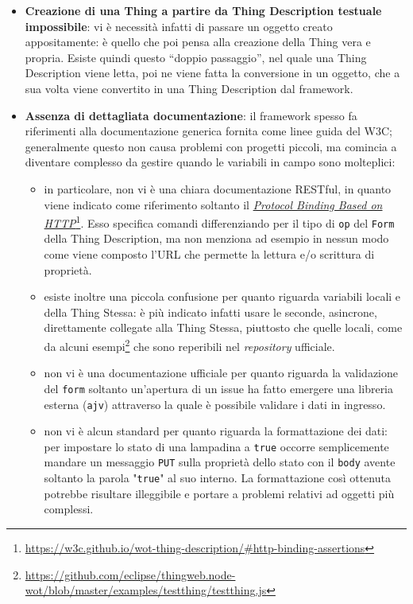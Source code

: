 \documentclass[12pt,a4paper,openright,oneside]{report}
\newcommand{\quotes}[1]{``#1''}
\begin{document}
\begin{itemize}
	\item \textbf{Creazione di una Thing a partire da Thing Description testuale impossibile}: vi è necessità infatti di passare un oggetto creato appositamente: è quello che poi pensa alla creazione della Thing vera e propria. Esiste quindi questo \quotes{doppio passaggio}, nel quale una Thing Description viene letta, poi ne viene fatta la conversione in un oggetto, che a sua volta viene convertito in una Thing Description dal framework.
	
	\item \textbf{Assenza di dettagliata documentazione}: il framework spesso fa riferimenti alla documentazione generica fornita come linee guida del W3C; generalmente questo non causa problemi con progetti piccoli, ma comincia a diventare complesso da gestire quando le variabili in campo sono molteplici:
		\begin{itemize}
			\item in particolare, non vi è una chiara documentazione RESTful, in quanto viene indicato come riferimento soltanto il \href{https://w3c.github.io/wot-thing-description/#http-binding-assertions}{\textit{Protocol Binding Based on HTTP}}\footnote{\url{https://w3c.github.io/wot-thing-description/\#http-binding-assertions}}. Esso specifica comandi differenziando per il tipo di \texttt{op} del \texttt{Form} della Thing Description, ma non menziona ad esempio in nessun modo come viene composto l'URL che permette la lettura e/o scrittura di proprietà.
			
			\item esiste inoltre una piccola confusione per quanto riguarda variabili locali e della Thing Stessa: è più indicato infatti usare le seconde, asincrone, direttamente collegate alla Thing Stessa, piuttosto che quelle locali, come da alcuni esempi\footnote{\url{https://github.com/eclipse/thingweb.node-wot/blob/master/examples/testthing/testthing.js}} che sono reperibili nel \textit{repository} ufficiale.
			
			\item non vi è una documentazione ufficiale per quanto riguarda la validazione del \texttt{form} soltanto un'apertura di un issue ha fatto emergere una libreria esterna (\texttt{ajv}) attraverso la quale è possibile validare i dati in ingresso.
			
			\item non vi è alcun standard per quanto riguarda la formattazione dei dati: per impostare lo stato di una lampadina a \texttt{true} occorre semplicemente mandare un messaggio \texttt{PUT} sulla proprietà dello stato con il \texttt{body} avente soltanto la parola "\texttt{true}" al suo interno. La formattazione così ottenuta potrebbe risultare illeggibile e portare a problemi relativi ad oggetti più complessi.
			

\end{itemize}
\end{itemize}
\end{document}
